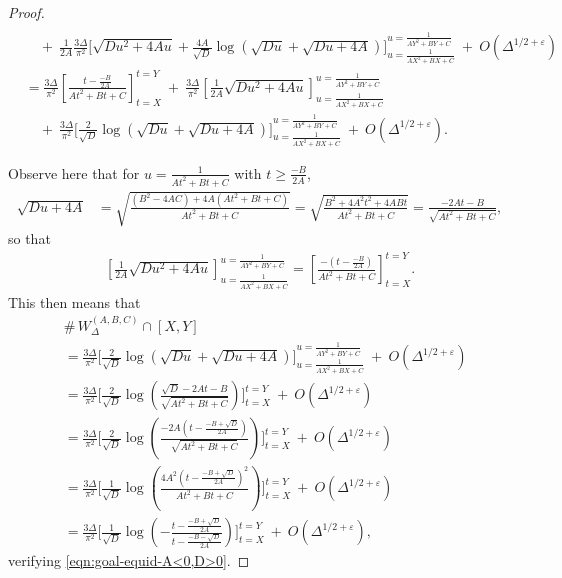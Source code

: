 \documentclass[11pt,letterpaper,reqno]{amsart}
\numberwithin{equation}{section}
\numberwithin{figure}{section}
\numberwithin{table}{section}
\newcommand{\lrp}[1]{\left(#1\right)}
\newcommand{\lrb}[1]{\left[#1\right]}
\begin{document}
\begin{proof}
\begin{align}
    \\
    &\quad +~ \frac{1}{2A} \frac{3\Delta}{\pi^2}\Bigg[ \sqrt{Du^2+4Au} +  \frac{4A}{\sqrt D}
            \log\lrp{
                \sqrt{Du} + \sqrt{Du+4A}
            }
         \Bigg]_{u=\frac{1}{AX^2+BX+C}}^{u=\frac{1}{AY^2+BY+C}} ~+~ O(\Delta^{1/2+\varepsilon}) \\
    &= \frac{3\Delta}{\pi^2} \lrb{ \frac{t-\frac{-B}{2A}}{At^2+Bt+C}}_{t=X}^{t=Y} 
    ~+~ \frac{3\Delta}{\pi^2} \lrb{
        \frac{1}{2A} \sqrt{Du^2+4Au}
    }_{u=\frac{1}{AX^2+BX+C}}^{u=\frac{1}{AY^2+BY+C}}
    \\
    &\quad +~ \frac{3\Delta}{\pi^2}\Bigg[
            \frac{2}{\sqrt D}
            \log\lrp{
                \sqrt{Du} + \sqrt{Du+4A}
            }
         \Bigg]_{u=\frac{1}{AX^2+BX+C}}^{u=\frac{1}{AY^2+BY+C}} ~+~ O(\Delta^{1/2+\varepsilon}). 
\end{align}

Observe here that for $u = \frac{1}{At^2+Bt+C}$ with $t \ge \frac{-B}{2A}$, 
\begin{align}
    \sqrt{Du +4A} &= \sqrt{\frac{(B^2-4AC) + 4A(At^2+Bt+C)}{At^2+Bt+C}} = \sqrt{\frac{B^2 + 4A^2t^2 + 4ABt}{At^2+Bt+C}} = \frac{-2At-B}{\sqrt{At^2+Bt+C}},
\end{align}
so that
\begin{align}
    \lrb{
        \frac{1}{2A} \sqrt{Du^2+4Au}
    }_{u=\frac{1}{AX^2+BX+C}}^{u=\frac{1}{AY^2+BY+C}} = \lrb{\frac{-(t-\frac{-B}{2A})}{At^2+Bt+C}}_{t=X}^{t=Y}.
\end{align}
This then means that
\begin{align}
    & \#\, W_{\Delta}^{(A,B,C)} \cap [X,Y] \\
    &=  \frac{3\Delta}{\pi^2}\Bigg[ 
            \frac{2}{\sqrt D}
            \log\lrp{
                \sqrt{Du} + \sqrt{Du+4A}
            }
         \Bigg]_{u=\frac{1}{AX^2+BX+C}}^{u=\frac{1}{AY^2+BY+C}} ~+~ O(\Delta^{1/2+\varepsilon}) \\
    &=  \frac{3\Delta}{\pi^2}\Bigg[ 
            \frac{2}{\sqrt D}
            \log\lrp{\frac{\sqrt{D} - 2At-B}{\sqrt{At^2+Bt+C}}}  
         \Bigg]_{t=X}^{t=Y} 
        ~+~ O(\Delta^{1/2+\varepsilon}) \\
    &=  \frac{3\Delta}{\pi^2}\Bigg[ 
            \frac{2}{\sqrt D} 
            \log\lrp{\frac{-2A\lrp{
                t - \frac{-B+\sqrt{D}}{2A}
            }}{\sqrt{At^2+Bt+C}}}
         \Bigg]_{t=X}^{t=Y} 
         ~+~ O(\Delta^{1/2+\varepsilon}) \\
    &=  \frac{3\Delta}{\pi^2}\Bigg[ 
            \frac{1}{\sqrt D} 
            \log\lrp{\frac{4A^2\lrp{
                t - \frac{-B+\sqrt{D}}{2A}
            }^2}{At^2+Bt+C}}
         \Bigg]_{t=X}^{t=Y} 
         ~+~ O(\Delta^{1/2+\varepsilon}) \\
    &=  \frac{3\Delta}{\pi^2}
    \Bigg[ 
        \frac{1}{\sqrt D}
        \log\lrp{
        -\frac{
            t - \frac{-B+\sqrt{D}}{2A}
        }{
            t - \frac{-B-\sqrt{D}}{2A}
        }
        }
    \Bigg]_{t=X}^{t=Y} 
         ~+~ O(\Delta^{1/2+\varepsilon}),
\end{align}
verifying \eqref{eqn:goal-equid-A<0,D>0}.





\end{proof}
\end{document}
